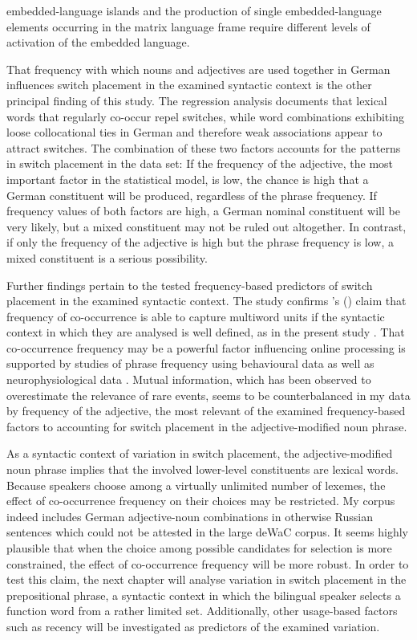embedded-language islands and the production of single embedded-language elements occurring in the matrix language frame require different levels of activation of the embedded language.

That frequency with which nouns and adjectives are used together in German influences switch placement in the examined syntactic context is the other principal finding of this study. The regression analysis documents that lexical words that regularly co-occur repel switches, while word combinations exhibiting loose collocational ties in German and therefore weak associations appear to attract switches. The combination of these two factors accounts for the patterns in switch placement in the data set: If the frequency of the adjective, the most important factor in the statistical model, is low, the chance is high that a German constituent will be produced, regardless of the phrase frequency. If frequency values of both factors are high, a German nominal constituent will be very likely, but a mixed constituent may not be ruled out altogether. In contrast, if only the frequency of the adjective is high but the phrase frequency is low, a mixed constituent is a serious possibility.

Further findings pertain to the tested frequency-based predictors of switch placement in the examined syntactic context. The study confirms \citeauthor{heylen-2014}'s (\citeyear{heylen-2014}) claim that frequency of co-occurrence is able to capture multiword units if the syntactic context in which they are analysed is well defined, as in the present study \citep[see also][]{schneider2014}. That co-occurrence frequency may be a powerful factor influencing online processing is supported by studies of phrase frequency using behavioural data \citep{arnon-snider,janssen-barber} as well as neurophysiological data \citep{tremblay-baayen}. Mutual information, which has been  observed to overestimate the relevance of rare events, seems to be counterbalanced in my data by frequency of the adjective, the most relevant of the examined frequency-based factors to accounting for switch placement in the adjective-modified noun phrase.

As a syntactic context of variation in switch placement, the adjective-modified noun phrase implies that the involved lower-level constituents are lexical words. Because speakers choose among a virtually unlimited number of lexemes, the effect of co-occurrence frequency on their choices may be restricted. My corpus indeed includes German adjective-noun combinations in otherwise Russian sentences which could not be attested in the large deWaC corpus. It seems highly plausible that when the choice among possible candidates for selection is more constrained, the effect of co-occurrence frequency will be more robust. In order to test this claim, the next chapter will analyse variation in switch placement in the prepositional phrase, a syntactic context in which the bilingual speaker selects a function word from a rather limited set. Additionally, other usage-based factors such as recency will be investigated as predictors of the examined variation.